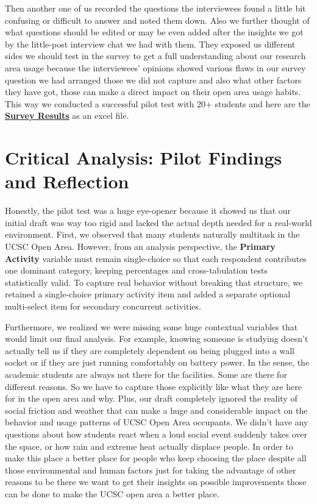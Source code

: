 \documentclass[12pt, a4paper]{report}
\begin{document}
Then another one of us recorded the questions the interviewees found a little bit confusing or difficult to answer and noted them down. Also we further thought of what questions should be edited or may be even added after the insights we got by the little-post interview chat we had with them. They exposed us different sides we should test in the survey to get a full understanding about our research area usage because the interviewees' opinions showed various flaws in our survey question we had arranged those we did not capture and also what other factors they have got, those can make a direct impact on their open area usage habits. This way we conducted a successful pilot test with 20+ students and here are the \href{https://docs.google.com/spreadsheets/d/15F8ChuzG3wAU8q_CIp5JnZFKxm5P4HrAdkYS0s_HcBU/edit?usp=sharing}{\textbf{Survey Results}} as an excel file.

\chapter{Critical Analysis: Pilot Findings and Reflection}
Honestly, the pilot test was a huge eye-opener because it showed us that our initial draft was way too rigid and lacked the actual depth needed for a real-world environment. First, we observed that many students naturally multitask in the UCSC Open Area. However, from an analysis perspective, the \textbf{Primary Activity} variable must remain single-choice so that each respondent contributes one dominant category, keeping percentages and cross-tabulation tests statistically valid. To capture real behavior without breaking that structure, we retained a single-choice primary activity item and added a separate optional multi-select item for secondary concurrent activities.

Furthermore, we realized we were missing some huge contextual variables that would limit our final analysis. For example, knowing someone is studying doesn't actually tell us if they are completely dependent on being plugged into a wall socket or if they are just running comfortably on battery power. In the sense, the academic students are always not there for the facilities. Some are there for different reasons. So we have to capture those explicitly like what they are here for in the open area and why. Plus, our draft completely ignored the reality of social friction and weather that can make a huge and considerable impact on the behavior and usage patterns of UCSC Open Area occupants. We didn't have any questions about how students react when a loud social event suddenly takes over the space, or how rain and extreme heat actually displace people. In order to make this place a better place for people who keep choosing the place despite all those environmental and human factors just for taking the advantage of other reasons to be there we want to get their insights on possible improvements those can be done to make the UCSC open area a better place.
\end{document}

